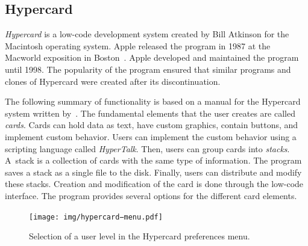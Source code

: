 \subsection{Hypercard}
\emph{Hypercard} is a low-code development system created by Bill Atkinson for the Macintosh operating system. Apple released the program in 1987 at the
Macworld exposition in Boston~\cite{hyper_release}. Apple developed and maintained the program until 1998.
The popularity of the program ensured that similar programs and clones of Hypercard were created after its discontinuation.

The following summary of functionality is based on a manual for the Hypercard system written by~\citet{goodman_hypertext}.
The fundamental elements that the user creates are called \emph{cards}. Cards can hold data as text, have custom graphics, contain buttons, and implement custom behavior.
Users can implement the custom behavior using a scripting language called \emph{HyperTalk}. Then, users can group cards into \emph{stacks}. A~stack is a collection of cards with the same type of information.
The program saves a stack as a single file to the disk. Finally, users can distribute and modify these stacks.
Creation and modification of the card is done through the low-code interface. The program provides several options for the different card elements.
\begin{figure}[htbp]
	\centering
	\texttt{[image: img/hypercard−menu.pdf]}
	\caption{Selection of a user level in the Hypercard preferences menu.}
	\label{fig:f}
\end{figure}

